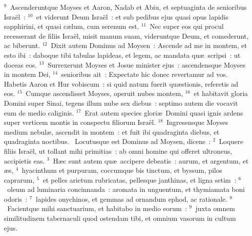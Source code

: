 ${}^{9}$~Ascenderuntque Moyses et Aaron, Nadab et Abiu, et septuaginta de senioribus Isra\"el~:
${}^{10}$~et viderunt Deum Isra\"el~: et sub pedibus ejus quasi opus lapidis sapphirini, et quasi c\ae lum, cum serenum est.
${}^{11}$~Nec super eos qui procul recesserant de filiis Isra\"el, misit manum suam, videruntque Deum, et comederunt, ac biberunt.
${}^{12}$~Dixit autem Dominus ad Moysen~: Ascende ad me in montem, et esto ibi~: daboque tibi tabulas lapideas, et legem, ac mandata qu\ae\ scripsi~: ut doceas eos.
${}^{13}$~Surrexerunt Moyses et Josue minister ejus~: ascendensque Moyses in montem Dei,
${}^{14}$~senioribus ait~: Expectate hic donec revertamur ad vos. Habetis Aaron et Hur vobiscum~: si quid natum fuerit qu\ae stionis, referetis ad eos.
${}^{15}$~Cumque ascendisset Moyses, operuit nubes montem,
${}^{16}$~et habitavit gloria Domini super Sinai, tegens illum nube sex diebus~: septimo autem die vocavit eum de medio caliginis.
${}^{17}$~Erat autem species glori\ae\ Domini quasi ignis ardens super verticem montis in conspectu filiorum Isra\"el.
${}^{18}$~Ingressusque Moyses medium nebul\ae , ascendit in montem~: et fuit ibi quadraginta diebus, et quadraginta noctibus.
~Locutusque est Dominus ad Moysen, dicens~:
${}^{2}$~Loquere filiis Isra\"el, ut tollant mihi primitias~: ab omni homine qui offeret ultroneus, accipietis eas.
${}^{3}$~H\ae c sunt autem qu\ae\ accipere debeatis~: aurum, et argentum, et \ae s,
${}^{4}$~hyacinthum et purpuram, coccumque bis tinctum, et byssum, pilos caprarum,
${}^{5}$~et pelles arietum rubricatas, pellesque janthinas, et ligna setim~:
${}^{6}$~oleum ad luminaria concinnanda~: aromata in unguentum, et thymiamata boni odoris~:
${}^{7}$~lapides onychinos, et gemmas ad ornandum ephod, ac rationale.
${}^{8}$~Facientque mihi sanctuarium, et habitabo in medio eorum~:
${}^{9}$~juxta omnem similitudinem tabernaculi quod ostendam tibi, et omnium vasorum in cultum ejus.

